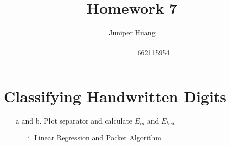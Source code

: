 \documentclass{homework}
\author{Juniper Huang \ \ \ \ \ \ \ \ \ \ \ \ \ \ \ \ \ \ \ \ \ \ \ \ \ \ \ \ \ \ \ \ \ \ \ \ \ \ \ \ \ \ \ \ \ \ \ \ \ \ \ \ \ \ \ \ \ \ \ \ \ \ \ \ \ \ \ \ \ \ \ \ \ \ \ \ \ \ \ \ \ \ \ \ 662115954}
\title{Homework 7}
\begin{document}
\maketitle
\section{Classifying Handwritten Digits}

\begin{itemize}
    \item[a and b.] Plot separator and calculate \(E_{in}\) and \(E_{test}\)
    \begin{itemize}
        \item[i.] Linear Regression and Pocket Algorithm
        \begin{figure}[h]
            \centering
            \qquad
        \end{figure}


\end{itemize}
\end{itemize}
\end{document}
